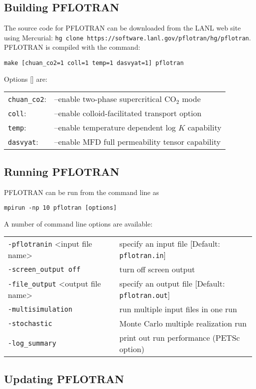 \documentclass[12pt]{article}
\begin{document}
\subsection{Building PFLOTRAN}

The source code for PFLOTRAN can be downloaded from the LANL web site using Mercurial: \verb|hg clone https://software.lanl.gov/pflotran/hg/pflotran|. PFLOTRAN is compiled with the command:

\verb|make [chuan_co2=1 coll=1 temp=1 dasvyat=1] pflotran|

\noindent
Options [] are: 

\begin{tabular}{ll}
\verb|chuan_co2|: & --enable two-phase supercritical CO$_2$ mode\\
\verb|coll|: & --enable colloid-facilitated transport option\\
\verb|temp|: & --enable temperature dependent log $K$ capability\\
\verb|dasvyat|: & --enable MFD full permeability tensor capability
\end{tabular}

\subsection{Running PFLOTRAN}

PFLOTRAN can be run from the command line as

\verb|mpirun -np 10 pflotran [options]|

A number of command line options are available:

\begin{tabular}{ll}
{\tt -pflotranin} <input file name> & specify an input file [Default: {\tt pflotran.in}]\\
{\tt -screen\_output off} & turn off screen output\\
{\tt -file\_output} <output file name> & specify an output file [Default: {\tt pflotran.out}]\\
{\tt -multisimulation} & run multiple input files in one run\\
{\tt -stochastic} & Monte Carlo multiple realization run\\
{\tt -log\_summary} & print out run performance (PETSc option)
\end{tabular}

\subsection*{Updating PFLOTRAN}
\end{document}
